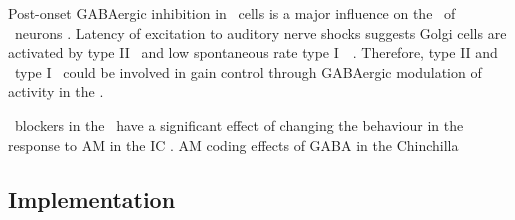 
Post-onset GABAergic inhibition in \DS~cells is a major influence on the \PSTH~of \OnC~neurons \citep{FerragamoGoldingEtAl:1998a,EvansZhao:1998}.
Latency of excitation to auditory nerve shocks suggests Golgi cells are activated by type II \ANFs~and low spontaneous rate type I~\ANFs~\citep{BensonBerglundEtAl:1996,FerragamoGoldingEtAl:1998}.
Therefore, type II and \LSR~type I \ANFs~could be involved in gain control through GABAergic modulation of activity in the \VCN.


\GABA~blockers in the \VCN~have a significant effect of changing the behaviour in the response to AM in the IC \citep{CasparyPalombiEtAl:2002}.  AM coding effects of GABA in the Chinchilla




\subsection{Implementation}





